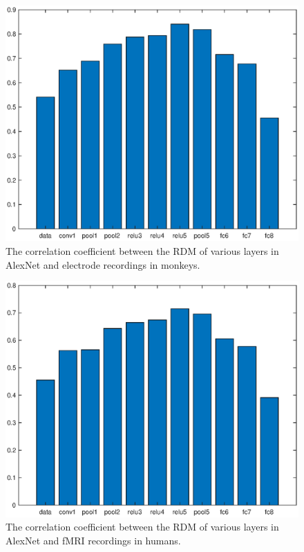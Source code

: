 \documentclass[11pt, oneside]{article}
\begin{document}
\begin{figure}[ht!]
\includegraphics[width=1\textwidth]{corrMonkey.eps}
\caption{The correlation coefficient between the RDM of various layers in AlexNet and electrode recordings in monkeys.}
\label{fig:corrMonkey}
\end{figure}

\begin{figure}[ht!]
\includegraphics[width=1\textwidth]{corrHuman.eps}
\caption{The correlation coefficient between the RDM of various layers in AlexNet and fMRI recordings in humans.}
\label{fig:corr:Human}
\end{figure}
\end{document}
